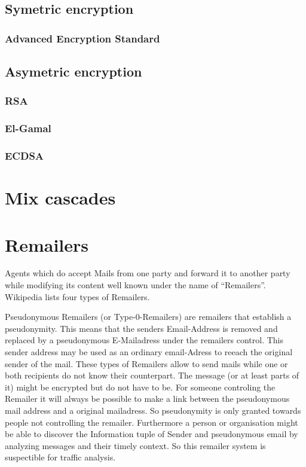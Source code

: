 \subsection{Symetric encryption}
\subsubsection{Advanced Encryption Standard}
\subsection{Asymetric encryption}
\subsubsection{RSA}
\subsubsection{El-Gamal}
\subsubsection{ECDSA}
\section{Mix cascades}
\section{Remailers}
Agents which do accept Mails from one party and forward it to another party while modifying its content well known under the name of ``Remailers''. Wi\-ki\-pe\-dia \cite{wiki:remailer} lists four types of Remailers.\par

Pseudonymous Remailers (or Type-0-Remailers) are remailers that establish a pseudonymity. This means that the senders Email-Address is removed and replaced by a pseudonymous E-Mailadress under the remailers control. This sender address may be used as an ordinary email-Adress to reeach the original sender of the mail. These types of Remailers allow to send mails while one or both recipients do not know their counterpart. The message (or at least parts of it) might be encrypted but do not have to be. For someone controling the Remailer it will always be possible to make a link between the pseudonymous mail address and a original mailadress. So pseudonymity is only granted towards people not controlling the remailer. Furthermore a person or organisation might be able to discover the Information tuple of Sender and pseudonymous email by analyzing messages and their timely context. So this remailer system is suspectible for traffic analysis.\par

